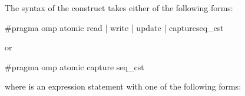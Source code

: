 \syntax
\ccppspecificstart
The syntax of the  construct takes either of the following forms:

\begin{boxedcode}
\#pragma omp atomic \plc{[}read \textnormal{|} write \textnormal{|} update \textnormal{|} 
 capture\plc{] [}seq\_cst\plc{]} 
\end{boxedcode}

or

\begin{boxedcode}
\#pragma omp atomic capture \plc{[}seq\_cst\plc{]} 
\end{boxedcode}

where  is an expression statement with one of the following forms:

